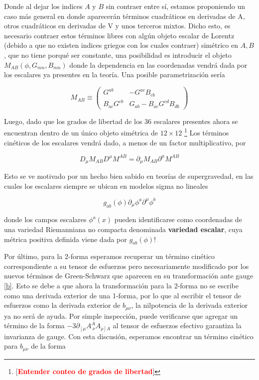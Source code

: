 \documentclass{article}
\numberwithin{equation}{section}
\begin{document}
Donde al dejar los indices $ A $ y $ B $ sin contraer entre sí, estamos proponiendo un caso más general en donde aparecerán términos cuadráticos en derivadas de A, otros cuadráticos en derivadas de V y unos terceros mixtos. Dicho esto, es necesario contraer estos términos libres con algún objeto escalar de Lorentz (debido a que no existen indices griegos con los cuales contraer) simétrico en $ A, B $, que no tiene porqué ser constante, una posibilidad es introducir el objeto $ M_{A B} (\phi,G_{m n}, B_{m n}) $ donde la dependencia en las coordenadas vendrá dada por los escalares ya presentes en la teoría. Una posible parametrización sería

\begin{equation}\label{M}
M_{A B} \equiv \begin{pmatrix}
G^{a b} & - G^{a c} B_{c b}\\
B_{a c} G^{c b} & G_{a b} - B_{a c} G^{c d} B_{d b}
\end{pmatrix}
\end{equation}


Luego, dado que los grados de libertad de los 36 escalares presentes ahora se encuentran dentro de un único objeto simétrica de $ 12 \times 12 $
\footnote{[\textcolor{red}{\textbf{Entender conteo de grados de libertad}}]}
Los términos cinéticos de los escalares vendrá dado, a menos de un factor multiplicativo, por

\begin{equation}
D_{\mu} M_{A B} D^{\mu} M^{A B} = \partial_{\mu} M_{A B} \partial^{\mu} M^{A B}
\end{equation} 

Esto se ve motivado por un hecho bien sabido en teorías de supergravedad, en las cuales los escalares siempre se ubican en modelos sigma no lineales

\begin{equation}
	g_{a b}(\phi) \partial_{\mu} \phi^a \partial^{\mu} \phi^b
\end{equation}

donde los campos escalares $ \phi^a(x) $ pueden identificarse como coordenadas de una variedad Riemanniana no compacta denominada \textbf{variedad escalar}, cuya métrica positiva definida viene dada por $ g_{a b} (\phi) $!

Por último, para la 2-forma esperamos recuperar un término cinético correspondiente a su tensor de esfuerzos pero necesariamente modificado por los nuevos términos de Green-Schwarz que aparecen en su transformación ante gauge \ref{b}. Esto se debe a que ahora la transformación para la 2-forma no se escribe como una derivada exterior de una 1-forma, por lo que al escribir el tensor de esfuerzos como la derivada exterior de $ b_{\mu \nu} $, la nilpotencia de la derivada exterior ya no será de ayuda. Por simple inspección, puede verificarse que agregar un término de la forma $ -3\partial_{\left[\mu\right.}A^A_{\ \nu}A_{\left.\rho\right] A} $ al tensor de esfuerzos efectivo garantiza la invarianza de gauge. Con esta discusión, esperamos encontrar un término cinético para $ b_{\mu \nu} $ de la forma
\end{document}

